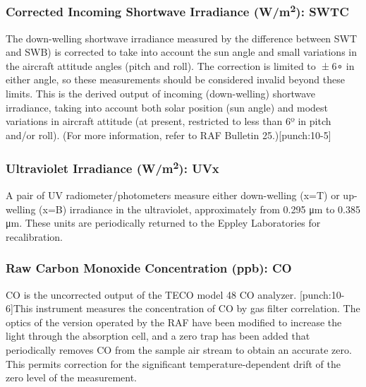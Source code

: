 \documentclass[
  english,
]{book}
\begin{document}
\hypertarget{swtc}{%
\subsubsection*{\texorpdfstring{Corrected Incoming Shortwave Irradiance (W/m\textsuperscript{2}): SWTC}{Corrected Incoming Shortwave Irradiance (W/m2): SWTC}}\label{swtc}}

The down-welling shortwave irradiance measured by the difference between SWT and SWB) is corrected to take into account the sun angle and small variations in the aircraft attitude angles (pitch and roll). The correction is limited to { ± 6∘} in either angle, so these measurements should be considered invalid beyond these limits. This is the derived output of incoming (down-welling) shortwave irradiance, taking into account both solar position (sun angle) and modest variations in aircraft attitude (at present, restricted to less than 6{º} in pitch and/or roll). (For more information, refer to RAF Bulletin 25.)\protect\hypertarget{punch:10-5}{}{{[}punch:10-5{]}}

\hypertarget{uvx}{%
\subsubsection*{\texorpdfstring{Ultraviolet Irradiance (W/m\textsuperscript{2}): UVx}{Ultraviolet Irradiance (W/m2): UVx}}\label{uvx}}

A pair of UV radiometer/photometers measure either down-welling (x=T) or up-welling (x=B) irradiance in the ultraviolet, approximately from 0.295 {μm} to 0.385 {μm}. These units are periodically returned to the Eppley Laboratories for recalibration.

\hypertarget{co}{%
\subsubsection*{Raw Carbon Monoxide Concentration (ppb): CO}\label{co}}

CO is the uncorrected output of the TECO model 48 CO analyzer. \protect\hypertarget{punch:10-6}{}{{[}punch:10-6{]}}This instrument measures the concentration of CO by gas filter correlation. The optics of the version operated by the RAF have been modified to increase the light through the absorption cell, and a zero trap has been added that periodically removes CO from the sample air stream to obtain an accurate zero. This permits correction for the significant temperature-dependent drift of the zero level of the measurement.
\end{document}
